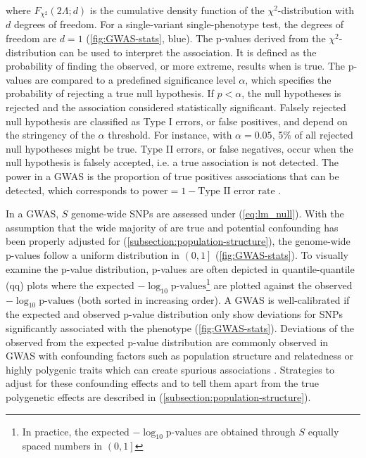 where \(F_{\chi^2}\left(2\Lambda; d\right)\) is the cumulative density function of the \(\chi^2\)-distribution with \(d\) degrees of freedom. For a single-variant single-phenotype test, the degrees of freedom are \(d=1\) (\cref{fig:GWAS-stats}, blue). The p-values derived from the \(\chi^2\)-distribution can be used to interpret the association. It is defined as the probability of finding the observed, or more extreme, results when \tnullH is true. The p-values are compared to a predefined significance level \(\alpha\), which specifies the probability of rejecting a true null hypothesis. If \(p < \alpha\), the null hypotheses is rejected and the association considered statistically significant. Falsely rejected null hypothesis are classified as Type I errors, or false positives, and depend on the stringency of the \(\alpha\) threshold. For instance, with  \(\alpha=0.05\), 5\% of all rejected null hypotheses might be true. Type II errors, or false negatives, occur when the null hypothesis is falsely accepted, i.e. a true association is not detected. The power in a GWAS is the proportion of true positives associations that can be detected, which corresponds to \(\text{power} = 1 - \text{Type II error rate}\)  \citep{Krzywinski2013a,Krzywinski2013b}.

In a GWAS, \(S\) genome-wide SNPs are assessed under \tnullH (\cref{eq:lm_null}). With the assumption that the wide majority of \tnullH are true and potential confounding has been properly adjusted for (\cref{subsection:population-structure}), the genome-wide p-values follow a uniform distribution in \(\left(0,1\right]\) (\cref{fig:GWAS-stats}). To visually examine the p-value distribution, p-values are often depicted in quantile-quantile (qq) plots where the expected \(-\log_{10} \text{p-values}\)\footnote{In practice, the expected \(-\log_{10} \text{p-values}\) are obtained through \(S\) equally spaced numbers in \(\left(0,1\right]\)} are plotted against the observed \(-\log_{10} \text{p-values}\) (both sorted in increasing order). A GWAS is well-calibrated if the expected and observed p-value distribution only show deviations for SNPs significantly associated with the phenotype (\cref{fig:GWAS-stats}). Deviations of the observed from the expected p-value distribution are commonly observed in GWAS with confounding factors such as population structure and relatedness or highly polygenic traits which can create spurious associations \citep{Spielman1993,Lander1994,Marchini2004,Balding2006}. Strategies to adjust for these confounding effects and to tell them apart from the true polygenetic effects are described in (\cref{subsection:population-structure}). 

